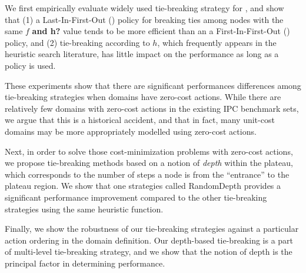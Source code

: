 We first empirically evaluate widely used tie-breaking strategy for \astar, and show that 
% 
(1) a Last-In-First-Out (\lifo) policy for breaking ties among nodes with the same $f$ {\bf and h?} value tends to be more efficient than an a First-In-First-Out (\fifo) policy, and 
% 
(2) tie-breaking according to $h$, which
frequently appears in the heuristic search literature, has little 
impact on the performance as long as a \lifo policy is used.
% 

These experiments show that there are significant performances differences among tie-breaking strategies
when domains have zero-cost actions.  While there are relatively few domains with zero-cost actions in the existing IPC benchmark sets, we argue that this is a historical accident, and that in fact, many unit-cost domains may be more appropriately modelled using zero-cost actions.

Next, in order to solve those cost-minimization problems with zero-cost actions,
we propose 
tie-breaking methods
based on a notion of \emph{depth} within the plateau, which corresponds to the number of steps 
a node is from the ``entrance'' to the plateau region.
We show that one strategies called RandomDepth provides a significant performance improvement
compared to the other tie-breaking strategies using the same heuristic function.

Finally, we show the robustness of our tie-breaking strategies
against a particular action ordering in the domain definition.
Our depth-based tie-breaking is a part of multi-level tie-breaking strategy,
and we show that the notion of depth is the principal factor in determining performance.





